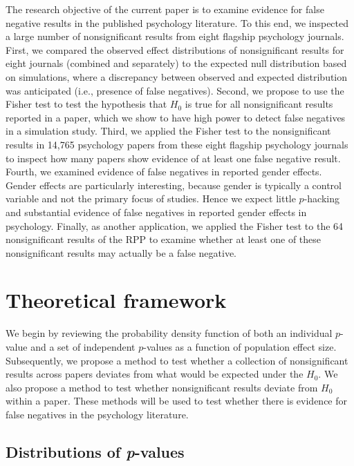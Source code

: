 \documentclass{article}
\begin{document}
The research objective of the current paper is to examine evidence for false negative results in the published psychology literature. To this end, we inspected a large number of nonsignificant results from eight flagship psychology journals. First, we compared the observed effect distributions of nonsignificant results for eight journals (combined and separately) to the expected null distribution based on simulations, where a discrepancy between observed and expected distribution was anticipated (i.e., presence of false negatives). Second, we propose to use the Fisher test to test the hypothesis that $H_0$ is true for all nonsignificant results reported in a paper, which we show to have high power to detect false negatives in a simulation study. Third, we applied the Fisher test to the nonsignificant results in 14,765 psychology papers from these eight flagship psychology journals to inspect how many papers show evidence of at least one false negative result. Fourth, we examined evidence of false negatives in reported gender effects. Gender effects are particularly interesting, because gender is typically a control variable and not the primary focus of studies. Hence we expect little $p$-hacking and substantial evidence of false negatives in reported gender effects in psychology. Finally, as another application, we applied the Fisher test to the 64 nonsignificant results of the RPP \cite{Open_Science_Collaboration2015-zs} to examine whether at least one of these nonsignificant results may actually be a false negative. 

\section*{Theoretical framework}

We begin by reviewing the probability density function of both an individual $p$-value and a set of independent $p$-values as a function of population effect size. Subsequently, we propose  a method to test whether a collection of nonsignificant results across papers deviates from what would be expected under the $H_0$. We also propose a method to test whether nonsignificant results deviate from $H_0$ within a paper. These methods will be used to test whether there is evidence for false negatives in the psychology literature.

\subsection*{Distributions of \textit{p}-values}
\end{document}
